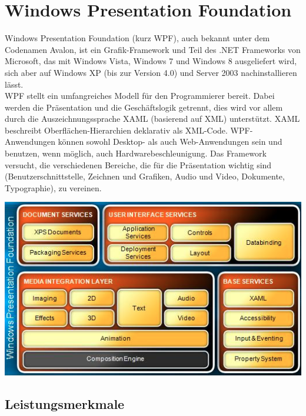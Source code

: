 \documentclass[10pt]{article}
\begin{document}
\section{Windows Presentation Foundation}
Windows Presentation Foundation (kurz WPF), auch bekannt unter dem Codenamen Avalon, ist ein Grafik-Framework und Teil des .NET Frameworks von Microsoft, das mit Windows Vista, Windows 7 und Windows 8 ausgeliefert wird, sich aber auf Windows XP (bis zur Version 4.0) und Server 2003 nachinstallieren lässt. \\
WPF stellt ein umfangreiches Modell für den Programmierer bereit. Dabei werden die Präsentation und die Geschäftslogik getrennt, dies wird vor allem durch die Auszeichnungssprache XAML (basierend auf XML) unterstützt. XAML beschreibt Oberflächen-Hierarchien deklarativ als XML-Code. WPF-Anwendungen können sowohl Desktop- als auch Web-Anwendungen sein und benutzen, wenn möglich, auch Hardwarebeschleunigung. Das Framework versucht, die verschiedenen Bereiche, die für die Präsentation wichtig sind (Benutzerschnittstelle, Zeichnen und Grafiken, Audio und Video, Dokumente, Typographie), zu vereinen.
\begin{center}
	\includegraphics[scale=0.6]{wpf_architecture.png}
\end{center}
\subsection{Leistungsmerkmale}
\end{document}
